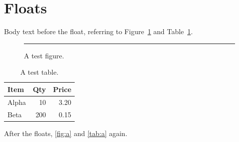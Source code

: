 \documentclass{article}
\begin{document}
\section{Floats}

Body text before the float, referring to Figure~\ref{fig:a} and
Table~\ref{tab:a}.

\begin{figure}[htbp]
\centering
\rule{4cm}{2cm}
\caption{A test figure.}
\label{fig:a}
\end{figure}

\begin{table}[htbp]
\centering
\caption{A test table.}
\label{tab:a}
\begin{tabular}{lrr}
\hline
Item & Qty & Price \\
\hline
Alpha & 10 & 3.20 \\
Beta & 200 & 0.15 \\
\hline
\end{tabular}
\end{table}

After the floats, \autoref{fig:a} and \autoref{tab:a} again.
\end{document}
